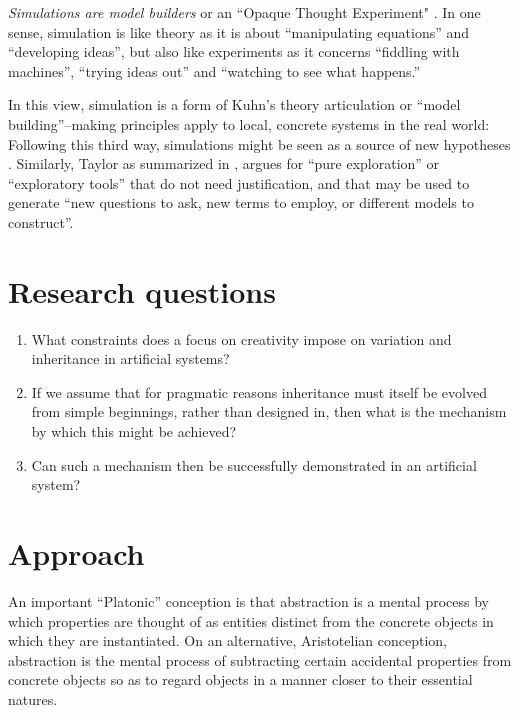 \emph{Simulations are model builders} \textcite[31]{Winsberg2010} or an ``Opaque Thought Experiment" \parencite{DiPaolo2000}. In one sense, simulation is like theory as it is about ``manipulating equations'' and ``developing ideas'', but also like experiments as it concerns ``fiddling with machines'', ``trying ideas out'' and ``watching to see what happens.'' \parencite{Winsberg2010}

In this view, simulation is a form of Kuhn's theory articulation or ``model building''--making principles apply to local, concrete systems in the real world:  Following this third way, simulations might be seen as a source of new hypotheses \parencite{Eldridge}. Similarly, Taylor as summarized in \textcite{Webb2009}, argues for ``pure exploration'' or ``exploratory tools'' that do not need justification, and that may be used to generate ``new questions to ask, new terms to employ, or different models to construct''.

\section{Research questions}\label{research-questions}

\vspace{0.3cm}
\begin{minipage}[l]{0.95\textwidth}
	\begin{enumerate}[label=RQ\arabic*:]
	\item What constraints does a focus on creativity impose on variation and inheritance in artificial systems? 
	\item If we assume that for pragmatic reasons inheritance must itself be evolved from simple beginnings, rather than designed in, then what is the mechanism by which this might be achieved?
	\item Can such a mechanism then be successfully demonstrated in an artificial system?
	\end{enumerate}
\end{minipage}
\vspace{0.3cm}

\section{Approach}

\epigraph{%
An important ``Platonic'' conception is that abstraction is a mental process by which properties are thought of as entities distinct from the concrete objects in which they are instantiated. On an alternative, Aristotelian conception, abstraction is the mental process of subtracting certain accidental properties from concrete objects so as to regard objects in a manner closer to their essential natures.}%
{\textsc{\\\textcite{Griesemer2005}}}

